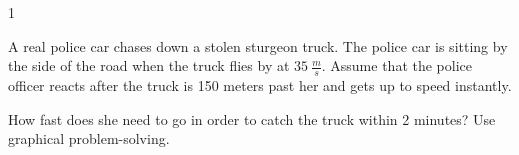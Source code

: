 
\AddToShipoutPicture*{\BackgroundPic}

\addtocounter {ProbNum} {1}

 
{\bf \Large{}}A real police car chases down a stolen sturgeon truck.  The police car is sitting by the side of the road when the truck flies by at ${35~\tfrac{m}{s}}$.  Assume that the police officer reacts after the truck is 150 meters past her and gets up to speed instantly.  
 

\bigskip
How fast does she need to go in order to catch the truck within 2 minutes? Use graphical problem-solving.
 
\vfill

\newpage